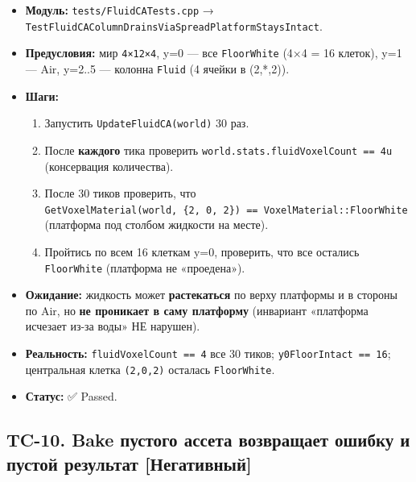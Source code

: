\begin{itemize}
\tightlist
\item
  \textbf{Модуль:} \texttt{tests/FluidCATests.cpp} → \texttt{TestFluidCAColumnDrainsViaSpreadPlatformStaysIntact}.
\item
  \textbf{Предусловия:} мир \texttt{4×12×4}, y=0 --- все \texttt{FloorWhite} (4×4 = 16 клеток), y=1 --- Air, y=2..5 --- колонна \texttt{Fluid} (4 ячейки в (2,*,2)).
\item
  \textbf{Шаги:}

  \begin{enumerate}
  \def\labelenumi{\arabic{enumi}.}
  \tightlist
  \item
    Запустить \texttt{UpdateFluidCA(world)} 30 раз.
  \item
    После \textbf{каждого} тика проверить \texttt{world.stats.fluidVoxelCount\ ==\ 4u} (консервация количества).
  \item
    После 30 тиков проверить, что \texttt{GetVoxelMaterial(world,\ \{2,\ 0,\ 2\})\ ==\ VoxelMaterial::FloorWhite} (платформа под столбом жидкости на месте).
  \item
    Пройтись по всем 16 клеткам y=0, проверить, что все остались \texttt{FloorWhite} (платформа не «проедена»).
  \end{enumerate}
\item
  \textbf{Ожидание:} жидкость может \textbf{растекаться} по верху платформы и в стороны по Air, но \textbf{не проникает в саму платформу} (инвариант «платформа исчезает из-за воды» НЕ нарушен).
\item
  \textbf{Реальность:} \texttt{fluidVoxelCount\ ==\ 4} все 30 тиков; \texttt{y0FloorIntact\ ==\ 16}; центральная клетка \texttt{(2,0,2)} осталась \texttt{FloorWhite}.
\item
  \textbf{Статус:} ✅ Passed.
\end{itemize}

\subsection{TC-10. Bake пустого ассета возвращает ошибку и пустой результат {[}Негативный{]}}\label{KT-2.2_Test_Report-tc-10-bake-ux43fux443ux441ux442ux43eux433ux43e-ux430ux441ux441ux435ux442ux430-ux432ux43eux437ux432ux440ux430ux449ux430ux435ux442-ux43eux448ux438ux431ux43aux443-ux438-ux43fux443ux441ux442ux43eux439-ux440ux435ux437ux443ux43bux44cux442ux430ux442-ux43dux435ux433ux430ux442ux438ux432ux43dux44bux439}

